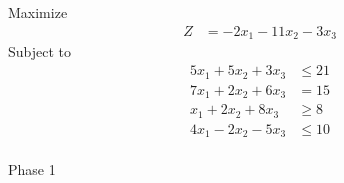 \documentclass[12pt]{article}
\begin{document}
\subsection{}
Maximize
\begin{align*}
Z                    & = -2x_{1}-11x_{2}-3x_{3}
\end{align*}
Subject to
\begin{align*}
5x_{1}+5x_{2}+3x_{3} & \le 21 \\
7x_{1}+2x_{2}+6x_{3} & = 15   \\
x_{1}+2x_{2}+8x_{3}  & \ge 8  \\
4x_{1}-2x_{2}-5x_{3} & \le 10 \\
\end{align*}

Phase 1                                                                                                                                                                                                                    \\[5pt]
\end{document}
